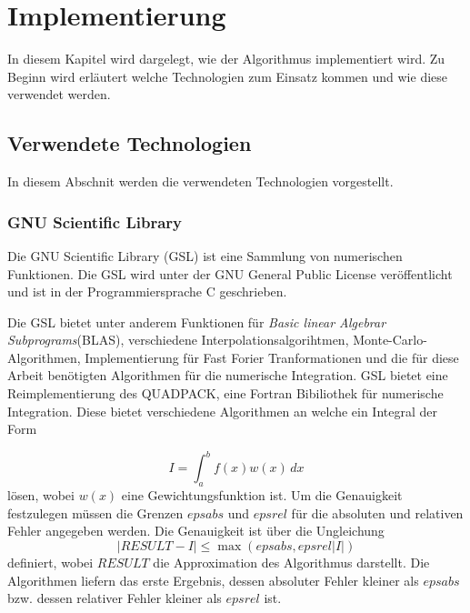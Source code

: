 \chapter{Implementierung}\label{impl}

In diesem Kapitel wird dargelegt, wie der Algorithmus implementiert wird. Zu Beginn wird erläutert welche Technologien zum Einsatz kommen und wie diese verwendet werden.
\section{Verwendete Technologien}

In diesem Abschnit werden die verwendeten Technologien vorgestellt. 


\subsection{GNU Scientific Library}

Die GNU Scientific Library (GSL) ist eine Sammlung von numerischen Funktionen\cite{gsl}. Die GSL wird unter der GNU General Public License veröffentlicht und ist in der Programmiersprache C geschrieben.

Die GSL bietet unter anderem Funktionen für \textit{Basic linear Algebrar Subprograms}(BLAS), verschiedene Interpolationsalgorihtmen, Monte-Carlo-Algorithmen, Implementierung für Fast Forier Tranformationen und die für diese 
Arbeit benötigten Algorithmen für die numerische Integration.
GSL bietet eine Reimplementierung des QUADPACK\cite{quadpack}, eine Fortran Bibiliothek für numerische Integration.
Diese bietet verschiedene Algorithmen an welche ein Integral der Form

\begin{equation*}
    I = \int_{a}^{b} f(x) w(x) \,dx
\end{equation*}
lösen, wobei $w(x)$ eine Gewichtungsfunktion ist. Um die Genauigkeit festzulegen müssen die Grenzen $epsabs$ und $epsrel$ für die absoluten und relativen Fehler angegeben werden.
Die Genauigkeit ist über die Ungleichung 
\begin{equation*}
    |RESULT - I| \leq \max{(epsabs, epsrel |I|)}
\end{equation*}
definiert, wobei $RESULT$ die Approximation des Algorithmus darstellt. Die Algorithmen liefern das erste Ergebnis, dessen absoluter Fehler kleiner als $epsabs$ bzw. dessen relativer Fehler kleiner als $epsrel$ ist.



